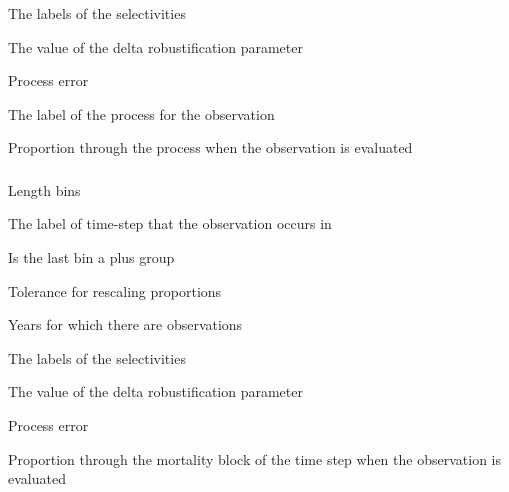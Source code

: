  {The labels of the selectivities}

 {The value of the delta robustification parameter}

 {Process error}

 {The label of the process for the observation}

 {Proportion through the process when the observation is evaluated}

\subsubsection[Proportions At Length]{}

 {Length bins}

 {The label of time-step that the observation occurs in}

 {Is the last bin a plus group}

 {Tolerance for rescaling proportions}

 {Years for which there are observations}

 {The labels of the selectivities}

 {The value of the delta robustification parameter}

 {Process error}

 {Proportion through the mortality block of the time step when the observation is evaluated}

\subsubsection[Process Proportions By Category]{}


